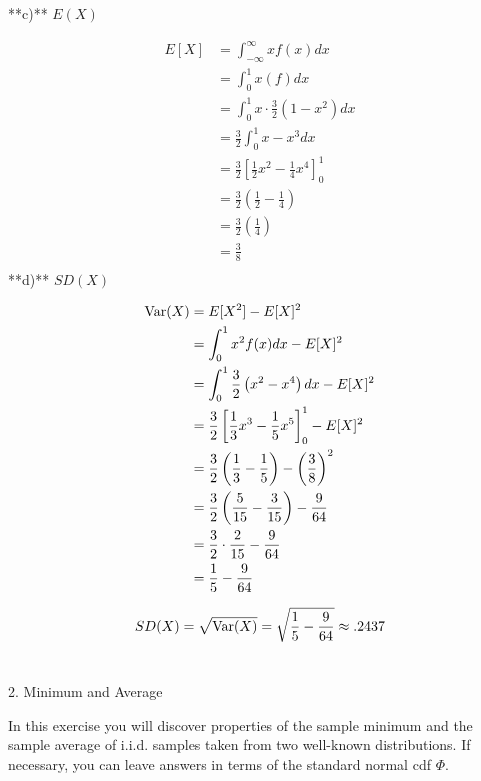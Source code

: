 \documentclass{report}
\begin{document}
**c)** $E(X)$


\begin{align*}
	E[X] &= \int_{-\infty}^{\infty} x f(x) dx \\
	&= \int_{0}^{1} x(f) dx \\
	&= \int_{0}^{1}x \cdot \frac{3}{2}(1-x^{2}) dx \\
	&= \frac{3}{2} \int_{0}^{1} x - x^{3} dx  \\
	&= \frac{3}{2} \left[ \frac{1}{2} x^{2} - \frac{1}{4} x^{4} \right]^{1}_{0} \\
	&= \frac{3}{2} \left( \frac{1}{2} - \frac{1}{4} \right)  \\
	&= \frac{3}{2} \left( \frac{1}{4} \right)  \\
	&= \frac{3}{8} \\
\end{align*}
**d)** $SD(X)$

\begin{align*}
	\operatorname{Var}(X) &= E[X^{2}] - E[X]^{2} \\
	&= \int_{0}^{1} x^{2} f(x) dx - E[X]^{2}\\
	&= \int_{0}^{1} \frac{3}{2} \left( x^{2} - x^{4} \right) dx - E[X]^{2} \\
	&= \frac{3}{2} \left[ \frac{1}{3}x^{3} - \frac{1}{5}x^{5}\right]^{1}_{0} - E[X]^{2} \\
	&= \frac{3}{2} \left( \frac{1}{3} - \frac{1}{5} \right) - \left( \frac{3}{8} \right) ^{2} \\
	&= \frac{3}{2} \left( \frac{5}{15} - \frac{3}{15} \right) - \frac{9}{64} \\
	&= \frac{3}{2} \cdot \frac{2}{15} - \frac{9}{64} \\
	&= \frac{1}{5} - \frac{9}{64} \\
\end{align*}

\[
	SD(X) = \sqrt{\operatorname{Var}(X)} = \sqrt{\frac{1}{5} - \frac{9}{64}} \approx .2437 \\
\]




\newpage

\section{}


 2. Minimum and Average 

In this exercise you will discover properties of the sample minimum and the sample average of i.i.d. samples taken from two well-known distributions. If necessary, you can leave answers in terms of the standard normal cdf $\Phi$.
\end{document}
